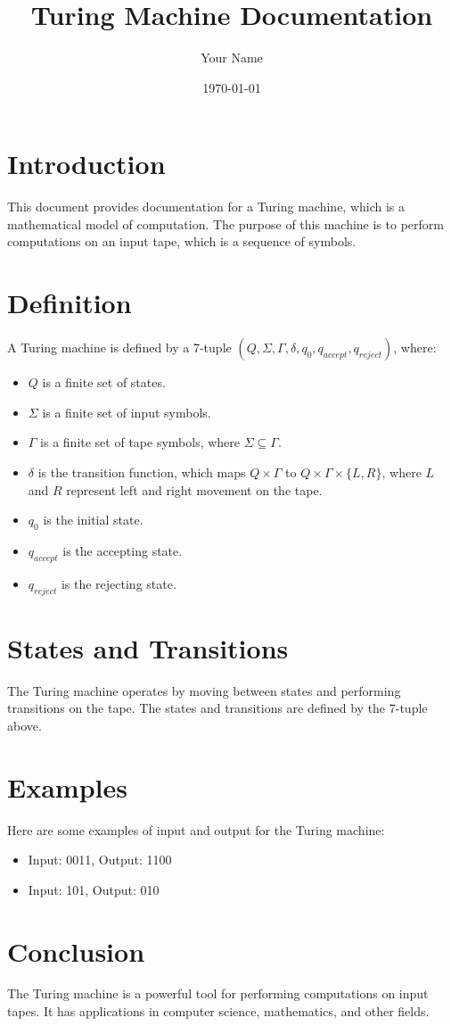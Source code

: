 \documentclass{article}
\title{Turing Machine Documentation}
\author{Your Name}
\date{\today}
\begin{document}
\maketitle

\section{Introduction}
This document provides documentation for a Turing machine, which is a mathematical model of computation. The purpose of this machine is to perform computations on an input tape, which is a sequence of symbols.

\section{Definition}
A Turing machine is defined by a 7-tuple $(Q, \Sigma, \Gamma, \delta, q_0, q_{accept}, q_{reject})$, where:
\begin{itemize}
    \item $Q$ is a finite set of states.
    \item $\Sigma$ is a finite set of input symbols.
    \item $\Gamma$ is a finite set of tape symbols, where $\Sigma \subseteq \Gamma$.
    \item $\delta$ is the transition function, which maps $Q \times \Gamma$ to $Q \times \Gamma \times \{L, R\}$, where $L$ and $R$ represent left and right movement on the tape.
    \item $q_0$ is the initial state.
    \item $q_{accept}$ is the accepting state.
    \item $q_{reject}$ is the rejecting state.
\end{itemize}

\section{States and Transitions}
The Turing machine operates by moving between states and performing transitions on the tape. The states and transitions are defined by the 7-tuple above.

\section{Examples}
Here are some examples of input and output for the Turing machine:
\begin{itemize}
    \item Input: 0011, Output: 1100
    \item Input: 101, Output: 010
\end{itemize}

\section{Conclusion}
The Turing machine is a powerful tool for performing computations on input tapes. It has applications in computer science, mathematics, and other fields.
\end{document}
